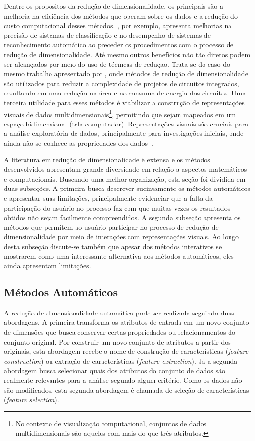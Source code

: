 Dentre os propósitos da redução de dimensionalidade, os
principais são a melhoria na eficiência dos métodos que
operam sobre os dados e a redução do custo computacional
desses métodos. \cite{Konig2000}, por exemplo, apresenta
melhorias na precisão de sistemas de classificação e no
desempenho de sistemas de reconhecimento automático ao
preceder os procedimentos com o processo de redução de
dimensionalidade. Até mesmo outros benefícios não tão
diretos podem ser alcançados por meio do uso de técnicas de
redução. Trata-se do caso do mesmo trabalho apresentado por
\citeauthor{Konig2000}, onde métodos de redução de
dimensionalidade são utilizados para reduzir a complexidade
de projetos de circuitos integrados, resultando em uma
redução na área e no consumo de energia dos circuitos. Uma
terceira utilidade para esses métodos 
é viabilizar a construção de representações
visuais de dados multidimensionais\footnote{No contexto de
visualização computacional, conjuntos de dados
multidimensionais são aqueles com mais do que três
atributos.}, permitindo que sejam mapeados em um espaço
bidimensional (tela computador).  Representações visuais 
são cruciais para a análise exploratória de dados,
principalmente para investigações iniciais, onde
ainda não se conhece as propriedades dos
dados~\cite{Kaski2011}. 

A literatura em redução de dimensionalidade é extensa e os
métodos desenvolvidos apresentam grande diversidade em
relação a aspectos matemáticos e computacionais. Buscando
uma melhor organização, esta seção foi dividida em duas
subseções. A primeira busca descrever sucintamente os
métodos automáticos e apresentar suas limitações,
principalmente evidenciar que a falta da participação do
usuário no processo faz com que muitas vezes os resultados
obtidos não sejam facilmente compreendidos. A segunda
subseção apresenta os métodos que permitem ao usuário
participar no processo de redução de dimensionalidade por
meio de interações com representações visuais. Ao longo
desta subseção discute-se também que apesar dos métodos
interativos se mostrarem como uma interessante alternativa
aos métodos automáticos, eles ainda apresentam limitações. 

\subsection{Métodos Automáticos}

A redução de dimensionalidade automática pode ser realizada
seguindo duas abordagens. A primeira transforma os atributos
de entrada em um novo conjunto de dimensões que busca
conservar certas propriedades ou relacionamentos do conjunto
original. Por construir um novo conjunto de atributos a partir
dos originais, esta abordagem recebe o nome de construção de
características (\emph{feature construction}) ou 
extração de características (\emph{feature extraction}). Já
a segunda abordagem busca selecionar quais dos atributos do
conjunto de dados são realmente relevantes para a análise
segundo algum critério. Como os dados não são modificados,
esta segunda abordagem é chamada de seleção de
características (\emph{feature selection}).

